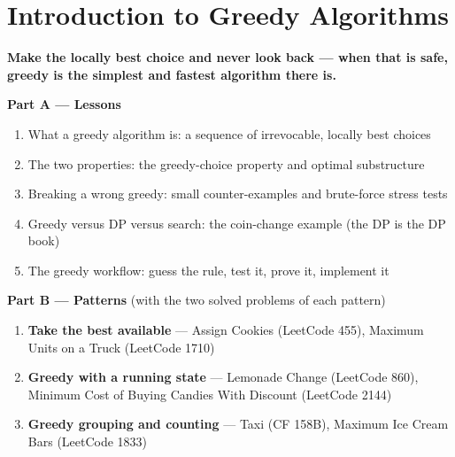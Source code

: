 \chapter{Introduction to Greedy Algorithms}
\label{ch:introduction}

\begin{tcolorbox}[enhanced, colback=white, colframe=secondaryblue, boxrule=1pt, arc=2mm]
\textbf{\large\textcolor{primaryblue}{Make the locally best choice and never look back --- when that is safe, greedy is the simplest and fastest algorithm there is.}}
\end{tcolorbox}


\begin{plannedbox}
\textbf{Part A --- Lessons}
\begin{enumerate}[leftmargin=*, label=\textbf{A\arabic*.}, itemsep=1pt]
    \item What a greedy algorithm is: a sequence of irrevocable, locally best choices
    \item The two properties: the greedy-choice property and optimal substructure
    \item Breaking a wrong greedy: small counter-examples and brute-force stress tests
    \item Greedy versus DP versus search: the coin-change example (the DP is the DP book)
    \item The greedy workflow: guess the rule, test it, prove it, implement it
\end{enumerate}
\textbf{Part B --- Patterns} (with the two solved problems of each pattern)
\begin{enumerate}[leftmargin=*, label=\textbf{P\arabic*.}, itemsep=1pt]
    \item \textbf{Take the best available} --- Assign Cookies {\small\color{darkgray}(LeetCode 455)}, Maximum Units on a Truck {\small\color{darkgray}(LeetCode 1710)}
    \item \textbf{Greedy with a running state} --- Lemonade Change {\small\color{darkgray}(LeetCode 860)}, Minimum Cost of Buying Candies With Discount {\small\color{darkgray}(LeetCode 2144)}
    \item \textbf{Greedy grouping and counting} --- Taxi {\small\color{darkgray}(CF 158B)}, Maximum Ice Cream Bars {\small\color{darkgray}(LeetCode 1833)}
\end{enumerate}
\end{plannedbox}
